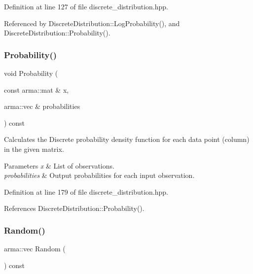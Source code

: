Definition at line 127 of file discrete\+\_\+distribution.\+hpp.



Referenced by Discrete\+Distribution\+::\+Log\+Probability(), and Discrete\+Distribution\+::\+Probability().

\mbox{\label{classmlpack_1_1distribution_1_1DiscreteDistribution_a1e516aca34e9c99caf1431a822d87fc6}} 
\subsubsection{Probability()\hspace{0.1cm}{\footnotesize\ttfamily [2/2]}}
{\footnotesize\ttfamily void Probability (\begin{DoxyParamCaption}\item[{const arma\+::mat \&}]{x,  }\item[{arma\+::vec \&}]{probabilities }\end{DoxyParamCaption}) const\hspace{0.3cm}{\ttfamily [inline]}}



Calculates the Discrete probability density function for each data point (column) in the given matrix. 


\begin{DoxyParams}{Parameters}
{\em x} & List of observations. \\
\hline
{\em probabilities} & Output probabilities for each input observation. \\
\hline
\end{DoxyParams}


Definition at line 179 of file discrete\+\_\+distribution.\+hpp.



References Discrete\+Distribution\+::\+Probability().

\mbox{\label{classmlpack_1_1distribution_1_1DiscreteDistribution_a2c6f8d5bb4eacf7de767d2172b320756}} 
\subsubsection{Random()}
{\footnotesize\ttfamily arma\+::vec Random (\begin{DoxyParamCaption}{ }\end{DoxyParamCaption}) const}



